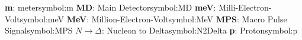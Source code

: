 \begin{tabbing}
\addsymbol \textbf{m}: {meter}{symbol:m}
\hspace{-0.27cm}
\addsymbol \textbf{MD}: {Main Detector}{symbol:MD}
\hspace{-0.27cm}
\addsymbol \textbf{meV}: {Milli-Electron-Volt}{symbol:meV}
\hspace{-0.27cm}
\addsymbol \textbf{MeV}: {Million-Electron-Volt}{symbol:MeV}
\hspace{-0.27cm}
\addsymbol \textbf{MPS}: {Macro Pulse Signal}{symbol:MPS}
\hspace{-0.27cm}
\addsymbol \textbf{$N \rightarrow \Delta$}: {Nucleon to Delta}{symbol:N2Delta}
\hspace{-0.27cm}
\addsymbol \textbf{p}: {Proton}{symbol:p}



\end{tabbing}
